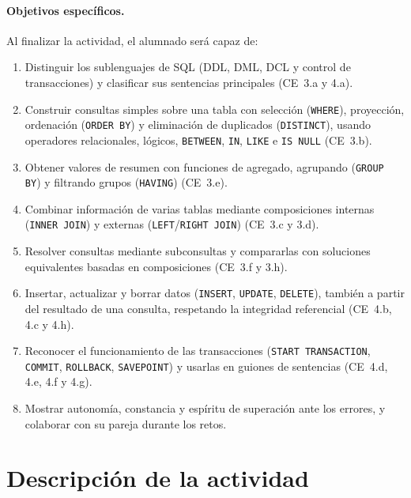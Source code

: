 \documentclass[11pt,a4paper]{article}
\begin{document}
\paragraph{Objetivos específicos.} Al finalizar la actividad, el alumnado será capaz de:
\begin{enumerate}[label=\textbf{O\arabic*.}]
  \item Distinguir los sublenguajes de SQL (DDL, DML, DCL y control de transacciones) y
        clasificar sus sentencias principales (CE~3.a y 4.a).
  \item Construir consultas simples sobre una tabla con selección (\texttt{WHERE}),
        proyección, ordenación (\texttt{ORDER BY}) y eliminación de duplicados
        (\texttt{DISTINCT}), usando operadores relacionales, lógicos, \texttt{BETWEEN},
        \texttt{IN}, \texttt{LIKE} e \texttt{IS NULL} (CE~3.b).
  \item Obtener valores de resumen con funciones de agregado, agrupando
        (\texttt{GROUP BY}) y filtrando grupos (\texttt{HAVING}) (CE~3.e).
  \item Combinar información de varias tablas mediante composiciones internas
        (\texttt{INNER JOIN}) y externas (\texttt{LEFT}/\texttt{RIGHT JOIN}) (CE~3.c y 3.d).
  \item Resolver consultas mediante subconsultas y compararlas con soluciones equivalentes
        basadas en composiciones (CE~3.f y 3.h).
  \item Insertar, actualizar y borrar datos (\texttt{INSERT}, \texttt{UPDATE},
        \texttt{DELETE}), también a partir del resultado de una consulta, respetando la
        integridad referencial (CE~4.b, 4.c y 4.h).
  \item Reconocer el funcionamiento de las transacciones (\texttt{START TRANSACTION},
        \texttt{COMMIT}, \texttt{ROLLBACK}, \texttt{SAVEPOINT}) y usarlas en guiones de
        sentencias (CE~4.d, 4.e, 4.f y 4.g).
  \item Mostrar autonomía, constancia y espíritu de superación ante los errores,
        y colaborar con su pareja durante los retos.
\end{enumerate}

\section{Descripción de la actividad}
\label{sec:actividad}
\end{document}
